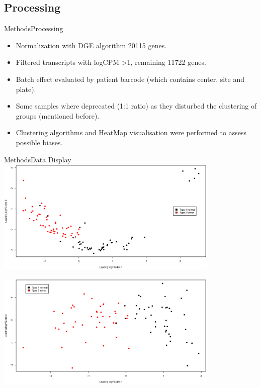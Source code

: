 \documentclass{beamer}
\begin{document}
\subsection{Processing}
\begin{frame}{Methods}{Processing}
	\begin{itemize}
		\item Normalization with DGE algorithm \cite{Robinson01012010} 20115 genes.
		\item Filtered transcripts with logCPM \textgreater 1, remaining 11722 genes.
		\item Batch effect evaluated by patient barcode  (which contains center, site and plate).
		\item Some samples where deprecated (1:1 ratio) as they disturbed the clustering of groups (mentioned before).
		\item Clustering algorithms and HeatMap visualisation were performed to assess possible biases.
	\end{itemize}

\end{frame}

\begin{frame}{Methods}{Data Display}
	\centering
	\includegraphics[width=0.8\textwidth,height=0.5\textheight,keepaspectratio]{mds2-1.eps}

	\includegraphics[width=0.8\textwidth,height=0.5\textheight,keepaspectratio]{mds4-1.eps}

\end{frame}
\end{document}
